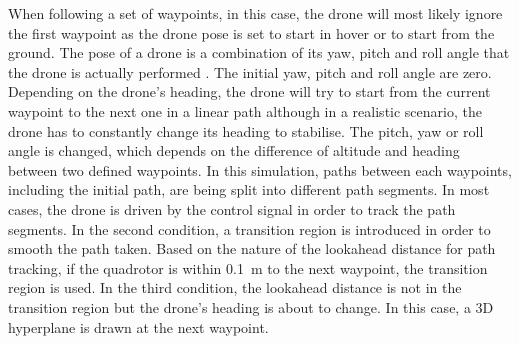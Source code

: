 When following a set of waypoints, in this case, the drone will most likely ignore the first waypoint as the drone pose is set to start in hover or to start from the ground. The pose of a drone is a combination of its yaw, pitch and roll angle that the drone is actually performed \cite{Roy5}. The initial yaw, pitch and roll angle are zero. Depending on the drone's heading, the drone will try to start from the current waypoint to the next one in a linear path although in a realistic scenario, the drone has to constantly change its heading to stabilise. The pitch, yaw or roll angle is changed, which depends on the difference of altitude and heading between two defined waypoints. In this simulation, paths between each waypoints, including the initial path, are being split into different path segments. In most cases, the drone is driven by the control signal in order to track the path segments. In the second condition, a transition region is introduced in order to smooth the path taken. Based on the nature of the lookahead distance for path tracking, if the quadrotor is within \SI{0.1}{\meter} to the next waypoint, the transition region is used. In the third condition, the lookahead distance is not in the transition region but the drone's heading is about to change. In this case, a 3D hyperplane is drawn at the next waypoint. 

